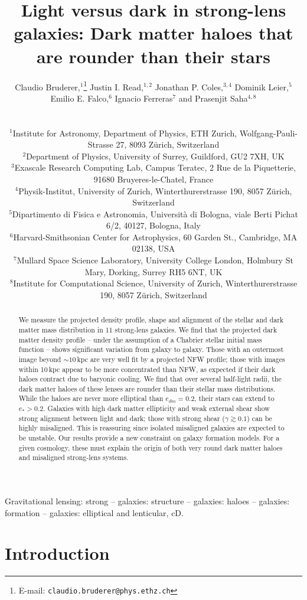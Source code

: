 \documentclass[useAMS,usenatbib]{mn2e}
\title[Light versus dark in strong-lens galaxies]{Light versus dark in strong-lens galaxies: Dark matter haloes that are rounder than their stars}
\author[Bruderer et al.]
{\parbox{\textwidth}{Claudio Bruderer,$^{1}$\thanks{E-mail: \texttt{claudio.bruderer@phys.ethz.ch}}
Justin I. Read,$^{1,2}$
Jonathan P. Coles,$^{3,4}$
Dominik Leier,$^{5}$
Emilio E. Falco,$^{6}$
Ignacio Ferreras$^{7}$ and
Prasenjit Saha$^{4,8}$}\vspace{0.4cm}\\
\parbox{\textwidth}{$^{1}$Institute for Astronomy, Department of Physics, ETH Zurich, Wolfgang-Pauli-Strasse 27, 8093 Z\"urich, Switzerland\\
$^{2}$Department of Physics, University of Surrey, Guildford, GU2 7XH, UK\\
$^{3}$Exascale Research Computing Lab, Campus Teratec, 2 Rue de la Piquetterie, 91680 Bruyeres-le-Chatel, France\\
$^{4}$Physik-Institut, University of Zurich, Winterthurerstrasse 190, 8057 Z\"urich, Switzerland\\
$^{5}$Dipartimento di Fisica e Astronomia, Universit\`{a} di Bologna, viale Berti Pichat 6/2, 40127, Bologna, Italy\\
$^{6}$Harvard-Smithsonian Center for Astrophysics, 60 Garden St., Cambridge, MA 02138, USA\\
$^{7}$Mullard Space Science Laboratory, University College London, Holmbury St Mary, Dorking, Surrey RH5 6NT, UK\\
$^{8}$Institute for Computational Science, University of Zurich, Winterthurerstrasse 190, 8057 Z\"urich, Switzerland}}
\begin{document}
\maketitle

\begin{abstract}
We measure the projected density profile, shape and alignment of the stellar and dark matter mass distribution in 11 strong-lens galaxies. We find that the projected dark matter density profile -- under the assumption of a Chabrier stellar initial mass function -- shows significant variation from galaxy to galaxy. Those with an outermost image beyond $\sim 10$\,kpc are very well fit by a projected NFW profile; those with images within 10\,kpc appear to be more concentrated than NFW, as expected if their dark haloes contract due to baryonic cooling. We find that over several half-light radii, the dark matter haloes of these lenses are rounder than their stellar mass distributions. While the haloes are never more elliptical than $e_{dm} = 0.2$, their stars can extend to $e_* > 0.2$. Galaxies with high dark matter ellipticity and weak external shear show strong alignment between light and dark; those with strong shear ($\gamma \gtrsim 0.1$) can be highly misaligned. This is reassuring since isolated misaligned galaxies are expected to be unstable. Our results provide a new constraint on galaxy formation models. For a given cosmology, these must explain the origin of both very round dark matter haloes and misaligned strong-lens systems.
\end{abstract}

\begin{keywords}
Gravitational lensing: strong -- galaxies: structure -- galaxies: haloes -- galaxies: formation -- galaxies: elliptical and lenticular, cD.
\end{keywords}


\section{Introduction}\label{sec:introduction}
\end{document}
